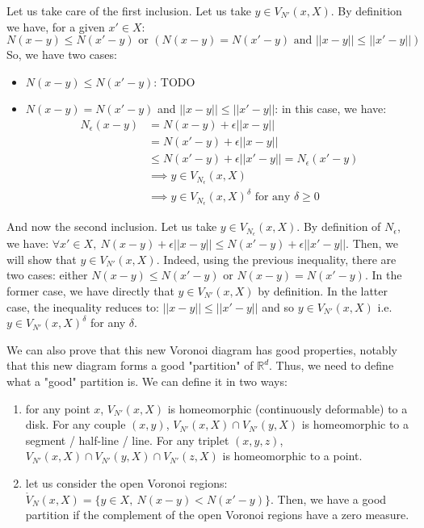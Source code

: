 Let us take care of the first inclusion. Let us take $ y \in V_{N'}(x, X) $. By
definition we have, for a given $ x' \in X $:
$$
N(x - y) \leq N(x' -y) \text{ or } (N(x - y) = N(x' - y) \text { and } || x -y
|| \leq || x' - y ||)
$$
So, we have two cases:
\begin{itemize}
    \item $ N(x - y) \leq N(x' - y) $: TODO
    \item $ N(x - y) = N(x' - y) $ and $ || x - y || \leq || x' - y || $: in
        this case, we have:
        \begin{align*}
            N_\epsilon(x - y) &= N(x - y) + \epsilon || x - y || \\
            &= N(x' - y) + \epsilon|| x - y || \\
            & \leq N(x' - y) + \epsilon || x' - y || = N_\epsilon(x' - y) \\
            & \implies y \in V_{N_\epsilon}(x, X) \\
            & \implies y \in V_{N_\epsilon}(x, X)^\delta \text{ for any } \delta
            \geq 0
        \end{align*}
\end{itemize}

And now the second inclusion. Let us take $ y \in V_{N_\epsilon}(x, X) $. By
definition of $ N_\epsilon $, we have: $ \forall x' \in X,~N(x - y) + \epsilon
|| x - y || \leq N(x' - y) + \epsilon || x' - y || $. Then, we will show that $
y \in V_{N'}(x, X) $. Indeed, using the previous inequality, there are two
cases: either $ N(x - y) \leq N(x' - y) $ or $ N(x - y) = N(x' - y) $. In the
former case, we have directly that $ y \in V_{N'}(x, X) $ by definition. In the
latter case, the inequality reduces to: $ || x - y || \leq || x' - y || $ and so
$ y \in V_{N'}(x, X) $ i.e. $ y \in V_{N'}(x, X)^{\delta} $ for any $ \delta $.

We can also prove that this new Voronoi diagram has good properties, notably
that this new diagram forms a good "partition" of $ \mathbb{R}^d $. Thus, we need to
define what a "good" partition is. We can define it in two ways:
\begin{enumerate}
    \item for any point $ x $, $ V_{N'}(x, X) $ is homeomorphic (continuously
        deformable) to a disk. For any couple $ (x, y) $, $ V_{N'}(x, X) \cap
        V_{N'}(y, X) $ is homeomorphic to a segment / half-line / line. For any
        triplet $ (x, y, z) $, $ V_{N'}(x, X) \cap V_{N'}(y, X) \cap V_{N'}(z,
        X) $ is homeomorphic to a point.
    \item let us consider the open Voronoi regions: $ \ocirc{V}_N(x, X) = \{ y
        \in X,~ N(x - y) < N(x' - y)\} $. Then, we have a good partition if the
        complement of the open Voronoi regions have a zero measure.
\end{enumerate}


